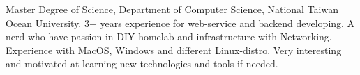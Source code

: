 

\begin{cvparagraph}

Master Degree of Science, Department of Computer Science, National Taiwan Ocean University. 
3+ years experience for web-service and backend developing. A nerd who have passion in DIY homelab and infrastructure with Networking. Experience with MacOS, Windows and different Linux-distro. Very interesting and motivated at learning new technologies and tools if needed.

\end{cvparagraph}
